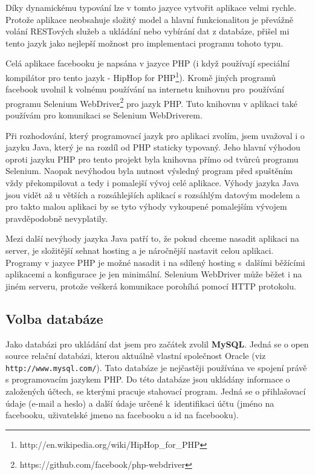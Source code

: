 \documentclass[thesis=M,czech]{FITthesis}[2013/05/10]
\begin{document}
Díky dynamickému typování lze v tomto jazyce vytvořit aplikace velmi rychle. Protože aplikace neobsahuje složitý model a hlavní funkcionalitou je převážně volání RESTových služeb a ukládání nebo vybírání dat z databáze, přišel mi tento jazyk jako nejlepší možnost pro implementaci programu tohoto typu.

Celá aplikace facebooku je napsána v jazyce PHP (i když používají speciální kompilátor pro tento jazyk - HipHop for PHP\footnote{http://en.wikipedia.org/wiki/HipHop\_for\_PHP}). Kromě jiných programů facebook uvolnil k volnému používání na internetu knihovnu pro~používání programu Selenium WebDriver\footnote{https://github.com/facebook/php-webdriver} pro jazyk PHP. Tuto knihovnu v aplikaci také používám pro komunikaci se Selenium WebDriverem.

Při rozhodování, který programovací jazyk pro aplikaci zvolím, jsem uvažoval i o jazyku Java, který je na rozdíl od PHP staticky typovaný. Jeho hlavní výhodou oproti jazyku PHP pro tento projekt byla knihovna přímo od tvůrců programu Selenium. Naopak nevýhodou byla nutnost výsledný program před spuštěním vždy překompilovat a tedy i pomalejší vývoj celé aplikace. Výhody jazyka Java jsou vidět až u větších a rozsáhlejších aplikací s rozsáhlým datovým modelem a pro takto malou aplikaci by se tyto výhody vykoupené pomalejším vývojem pravděpodobně nevyplatily. 

Mezi další nevýhody jazyka Java patří to, že pokud chceme nasadit aplikaci na server, je složitější sehnat hosting a je náročnější nastavit celou aplikaci. Programy v jazyce PHP je možné nasadit i na sdílený hosting s~dalšími běžícími aplikacemi a konfigurace je jen minimální. Selenium WebDriver může běžet i na jiném serveru, protože veškerá komunikace porohíhá pomocí HTTP protokolu.

\subsection{Volba databáze}

Jako databázi pro ukládání dat jsem pro začátek zvolil \textbf{MySQL}. Jedná se o open source relační databázi, kterou aktuálně vlastní společnost Oracle (viz \verb|http://www.mysql.com/|). Tato databáze je nejčastěji používána ve spojení právě s programovacím jazykem PHP. Do této databáze jsou ukládány informace o založených účtech, se kterými pracuje stahovací program. Jedná se o přihlašovací údaje (e-mail a heslo) a další údaje určené k~identifikaci účtu (jméno na facebooku, uživatelské jmeno na facebooku a id na facebooku).
\end{document}
